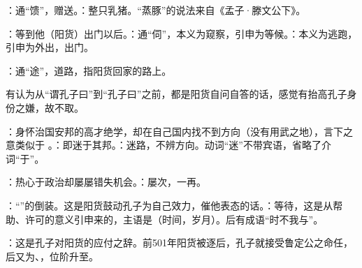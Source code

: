 {：通“馈”，赠送。：整只乳猪。“蒸豚”的说法来自《孟子·滕文公下》。%

\item {}：等到他（阳货）出门以后。：通“伺”，本义为窥察，引申为等候。：本义为逃跑，引申为外出，出门。

\item {}：通“途”，道路，指阳货回家的路上。

有认为从“谓孔子曰”到“孔子曰”之前，都是阳货自问自答的话，感觉有抬高孔子身份之嫌，故不取。

\item {}：身怀治国安邦的高才绝学，却在自己国内找不到方向（没有用武之地），言下之意类似于  。：即迷于其邦。：迷路，不辨方向。动词“迷”不带宾语，省略了介词“于”。

\item {}：热心于政治却屡屡错失机会。：屡次，一再。
\item {}：“”的倒装。这是阳货鼓动孔子为自己效力，催他表态的话。：等待，这是从帮助、许可的意义引申来的，主语是（时间，岁月）。后有成语“时不我与”。
\item {}：这是孔子对阳货的应付之辞。前501年阳货被逐后，孔子就接受鲁定公之命任，后又为、，位阶升至。
}
{}  %


